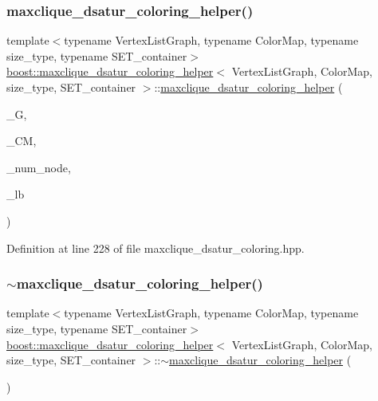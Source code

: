 \subsubsection{\texorpdfstring{maxclique\+\_\+dsatur\+\_\+coloring\+\_\+helper()}{maxclique\_dsatur\_coloring\_helper()}\hspace{0.1cm}{\footnotesize\ttfamily [1/2]}}
{\footnotesize\ttfamily template$<$typename Vertex\+List\+Graph, typename Color\+Map, typename size\+\_\+type, typename S\+E\+T\+\_\+container$>$ \\
\hyperlink{classboost_1_1maxclique__dsatur__coloring__helper}{boost\+::maxclique\+\_\+dsatur\+\_\+coloring\+\_\+helper}$<$ Vertex\+List\+Graph, Color\+Map, size\+\_\+type, S\+E\+T\+\_\+container $>$\+::\hyperlink{classboost_1_1maxclique__dsatur__coloring__helper}{maxclique\+\_\+dsatur\+\_\+coloring\+\_\+helper} (\begin{DoxyParamCaption}\item[{const Vertex\+List\+Graph \&}]{\+\_\+G,  }\item[{Color\+Map \&}]{\+\_\+\+CM,  }\item[{const size\+\_\+type}]{\+\_\+num\+\_\+node,  }\item[{size\+\_\+type \&}]{\+\_\+lb }\end{DoxyParamCaption})\hspace{0.3cm}{\ttfamily [inline]}}



Definition at line 228 of file maxclique\+\_\+dsatur\+\_\+coloring.\+hpp.

\mbox{\label{classboost_1_1maxclique__dsatur__coloring__helper_acc7336a87e1d310b8044850aeea9a6c6}} 
\subsubsection{\texorpdfstring{$\sim$maxclique\+\_\+dsatur\+\_\+coloring\+\_\+helper()}{~maxclique\_dsatur\_coloring\_helper()}}
{\footnotesize\ttfamily template$<$typename Vertex\+List\+Graph, typename Color\+Map, typename size\+\_\+type, typename S\+E\+T\+\_\+container$>$ \\
\hyperlink{classboost_1_1maxclique__dsatur__coloring__helper}{boost\+::maxclique\+\_\+dsatur\+\_\+coloring\+\_\+helper}$<$ Vertex\+List\+Graph, Color\+Map, size\+\_\+type, S\+E\+T\+\_\+container $>$\+::$\sim$\hyperlink{classboost_1_1maxclique__dsatur__coloring__helper}{maxclique\+\_\+dsatur\+\_\+coloring\+\_\+helper} (\begin{DoxyParamCaption}{ }\end{DoxyParamCaption})\hspace{0.3cm}{\ttfamily [inline]}}




